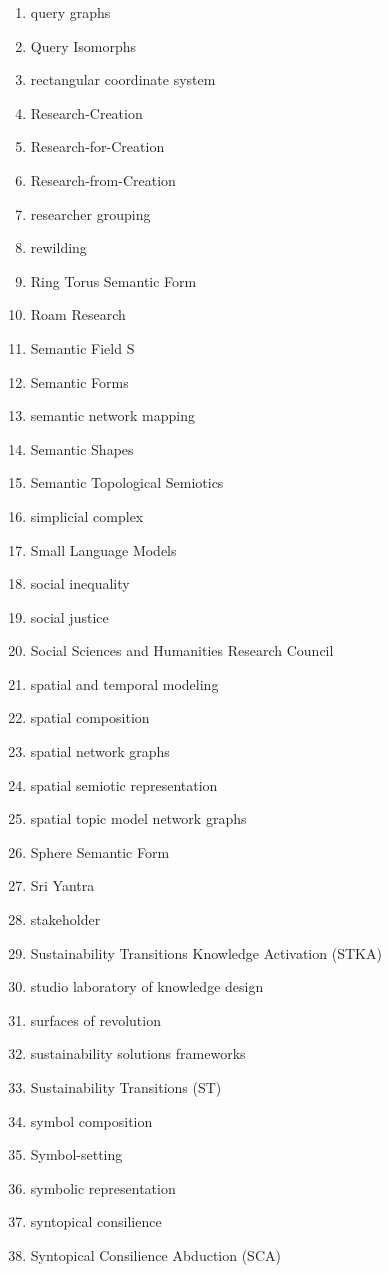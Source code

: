 \begin{multicols}{4}
\begin{enumerate}[label=\arabic*.]
\item query graphs
\item Query Isomorphs
\item rectangular coordinate system
\item Research-Creation
\item Research-for-Creation
\item Research-from-Creation
\item researcher grouping
\item rewilding
\item Ring Torus Semantic Form
\item Roam Research
\item Semantic Field S
\item Semantic Forms
\item semantic network mapping
\item Semantic Shapes
\item Semantic Topological Semiotics
\item simplicial complex
\item Small Language Models
\item social inequality
\item social justice
\item Social Sciences and Humanities Research Council
\item spatial and temporal modeling
\item spatial composition
\item spatial network graphs
\item spatial semiotic representation
\item spatial topic model network graphs
\item Sphere Semantic Form
\item Sri Yantra
\item stakeholder
\item Sustainability Transitions Knowledge Activation (STKA)
\item studio laboratory of knowledge design
\item surfaces of revolution
\item sustainability solutions frameworks
\item Sustainability Transitions (ST)
\item symbol composition
\item Symbol-setting
\item symbolic representation
\item syntopical consilience
\item Syntopical Consilience Abduction (SCA)

\end{enumerate}
\end{multicols}
